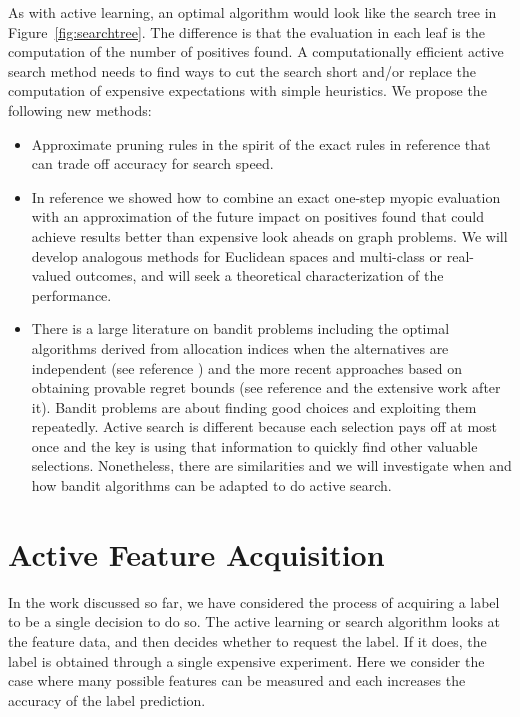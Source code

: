\documentclass[prd,nofootbib,floatfix,11pt,tightenlines,nofootinbib]{revtex4}
\begin{document}
As with active learning, an optimal algorithm would look like the search
tree in Figure~\ref{fig:searchtree}.  The difference is that the evaluation
in each leaf is the computation of the number of positives found.  A
computationally efficient active search method needs to find ways to cut
the search short and/or replace the computation of expensive expectations
with simple heuristics.  We propose the following new methods:
\vspace{.5\baselineskip}
\begin{itemize}
\item Approximate pruning rules in the spirit of the exact rules in reference
  \cite{Garnett12} that can trade off accuracy for search speed.

\item In reference \cite{Wang13} we showed how to combine an exact one-step myopic
  evaluation with an approximation of the future impact on positives found
  that could achieve results better than expensive look aheads on graph problems.
  We will develop analogous methods for Euclidean spaces and multi-class or
  real-valued outcomes, and will seek a theoretical characterization of the
  performance.

\item There is a large literature on bandit problems including the optimal
  algorithms derived from allocation indices when the alternatives are
  independent (see reference \cite{Gittin89}) and the more recent approaches based on
  obtaining provable regret bounds (see reference \cite{Auer02} and the extensive
  work after it).  Bandit problems are about finding good choices and
  exploiting them repeatedly.  Active search is different because each
  selection pays off at most once and the key is using that information to
  quickly find other valuable selections.  Nonetheless, there are
  similarities and we will investigate when and how bandit algorithms can
  be adapted to do active search.

\end{itemize}
\vspace{.5\baselineskip}

\section{Active Feature Acquisition}

In the work discussed so far, we have considered the process of acquiring a
label to be a single decision to do so.  The active learning or search
algorithm looks at the feature data, and then decides whether to request
the label.  If it does, the label is obtained through a single expensive
experiment.  Here we consider the case where many possible features can be
measured and each increases the accuracy of the label prediction.
\end{document}
